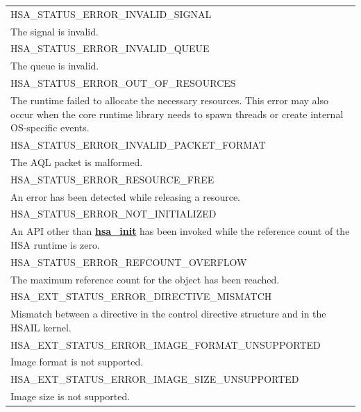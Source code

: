 \documentclass[final,oneside]{book}
\newcommand{\reffun}[1]{\textbf{#1}}
\newcommand{\reftyp}[1]{#1}
\newcommand{\refenu}[1]{\reftyp{#1}}
\begin{document}
\begin{longtable}{@{\hspace{2em}}p{\linewidth-2em}}
\hspace{-2em}\refenu{HSA_\-STATUS_\-ERROR_\-INVALID_\-SIGNAL}\\The signal is invalid.\\[2mm]
\hspace{-2em}\refenu{HSA_\-STATUS_\-ERROR_\-INVALID_\-QUEUE}\\The queue is invalid.\\[2mm]
\hspace{-2em}\refenu{HSA_\-STATUS_\-ERROR_\-OUT_\-OF_\-RESOURCES}\\The runtime failed to allocate the necessary resources. This error may also occur when the core runtime library needs to spawn threads or create internal OS-specific events.\\[2mm]
\hspace{-2em}\refenu{HSA_\-STATUS_\-ERROR_\-INVALID_\-PACKET_\-FORMAT}\\The AQL packet is malformed.\\[2mm]
\hspace{-2em}\refenu{HSA_\-STATUS_\-ERROR_\-RESOURCE_\-FREE}\\An error has been detected while releasing a resource.\\[2mm]
\hspace{-2em}\refenu{HSA_\-STATUS_\-ERROR_\-NOT_\-INITIALIZED}\\An API other than \hyperlink{group__initshutdown_1ga5b8574433e7dbcbd31ea397a02e3c32b}{\reffun{hsa_\-init}} has been invoked while the reference count of the HSA runtime is zero.\\[2mm]
\hspace{-2em}\refenu{HSA_\-STATUS_\-ERROR_\-REFCOUNT_\-OVERFLOW}\\The maximum reference count for the object has been reached.\\[2mm]
\hspace{-2em}\refenu{HSA_\-EXT_\-STATUS_\-ERROR_\-DIRECTIVE_\-MISMATCH}\\Mismatch between a directive in the control directive structure and in the HSAIL kernel.\\[2mm]
\hspace{-2em}\refenu{HSA_\-EXT_\-STATUS_\-ERROR_\-IMAGE_\-FORMAT_\-UNSUPPORTED}\\Image format is not supported.\\[2mm]
\hspace{-2em}\refenu{HSA_\-EXT_\-STATUS_\-ERROR_\-IMAGE_\-SIZE_\-UNSUPPORTED}\\Image size is not supported.
\end{longtable}
\end{document}
